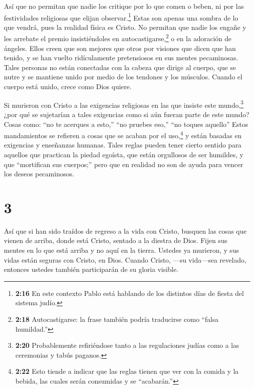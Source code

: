  Así que no permitan que nadie los critique por lo que
comen o beben, ni por las festividades religiosas que elijan
observar.\footnote{\textbf{2:16} En este contexto Pablo está hablando de
  los distintos días de fiesta del sistema judío.}  Estas
son apenas una sombra de lo que vendrá, pues la realidad física es
Cristo.  No permitan que nadie los engañe y les arrebate el
premio insistiéndoles en autocastigarse,\footnote{\textbf{2:18}
  Autocastigarse: la frase también podría traducirse como ``falsa
  humildad.''} o en la adoración de ángeles. Ellos creen que son mejores
que otros por visiones que dicen que han tenido, y se han vuelto
ridículamente pretensiosos en sus mentes pecaminosas. 
Tales personas no están conectadas con la cabeza que dirige al cuerpo,
que se nutre y se mantiene unido por medio de los tendones y los
músculos. Cuando el cuerpo está unido, crece como Dios quiere.

 Si murieron con Cristo a las exigencias religiosas en las
que insiste este mundo,\footnote{\textbf{2:20} Probablemente
  refiriéndose tanto a las regulaciones judías como a las ceremonias y
  tabús paganos.} ¿por qué se sujetarían a tales exigencias como si aún
fueran parte de este mundo?  Cosas como: ``no te acerques a
esto,'' ``no pruebes eso,'' ``no toques aquello''  Estos
mandamientos se refieren a cosas que se acaban por el uso,\footnote{\textbf{2:22}
  Esto tiende a indicar que las reglas tienen que ver con la comida y la
  bebida, las cuales serán consumidas y se ``acabarán.''} y están
basadas en exigencias y enseñanzas humanas.  Tales reglas
pueden tener cierto sentido para aquellos que practican la piedad
egoísta, que están orgullosos de ser humildes, y que ``mortifican sus
cuerpos;'' pero que en realidad no son de ayuda para vencer los deseos
pecaminosos.

\hypertarget{section-2}{%
\section{3}\label{section-2}}

 Así que si han sido traídos de regreso a la vida con
Cristo, busquen las cosas que vienen de arriba, donde está Cristo,
sentado a la diestra de Dios.  Fijen sus mentes en lo que
está arriba y no aquí en la tierra.  Ustedes ya murieron, y
sus vidas están seguras con Cristo, en Dios.  Cuando Cristo,
---su vida---sea revelado, entonces ustedes también participarán de su
gloria visible.

